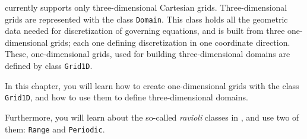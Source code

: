 \label{chap_domain}

{\psiboil} currently supports only three-dimensional Cartesian grids.
Three-dimensional grids are represented with the class {\tt Domain}. 
This class holds all the geometric data needed for discretization of 
governing equations, and is built from three one-dimensional grids; each 
one defining discretization in one coordinate direction. These, 
one-dimensional grids, used for building three-dimensional domains
are defined by class {\tt Grid1D}. 

In this chapter, you will learn how to create one-dimensional grids
with the class {\tt Grid1D}, and how to use them to define
three-dimensional domains. 

Furthermore, you will learn about the so-called {\em ravioli}
classes in {\psiboil}, and use two of them: {\tt Range} and
{\tt Periodic}.

